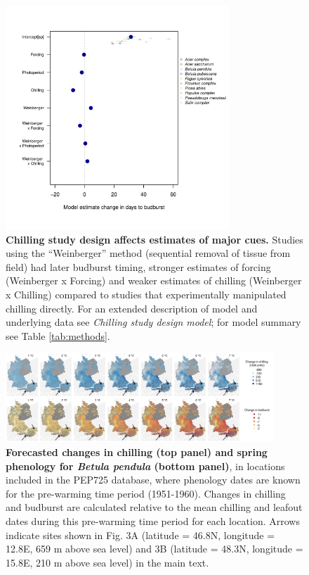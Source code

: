 \documentclass{article}
\begin{document}
\begin{figure}[h!]
\centering
\noindent \includegraphics[width=0.75\textwidth]{..//..//analyses/figures/weinberger_MU_4supp.pdf}
\caption{\textbf{Chilling study design affects estimates of major cues.} Studies using the ``Weinberger'' method (sequential removal of tissue from field) had later budburst timing, stronger estimates of forcing (Weinberger x Forcing) and weaker estimates of chilling (Weinberger x Chilling) compared to studies that experimentally manipulated chilling directly. For an extended description of model and underlying data see \emph{Chilling study design model}; for model summary see Table \ref{tab:methods}.}
\label{fig:weinberger}
\end{figure}

\begin{figure}[h!]
\centering
\noindent \includegraphics[width=0.90\textwidth]{..//..//analyses/bb_analysis/figures/forecasting/heatmapsbetpepfinalarrows.png}
\caption{\textbf{Forecasted changes in chilling (top panel) and spring phenology for \emph{Betula pendula} (bottom panel)}, in locations included in the PEP725 database, where phenology dates are known for the pre-warming time period (1951-1960). Changes in chilling and budburst are calculated relative to the mean chilling and leafout dates during this pre-warming time period for each location. Arrows indicate sites shown in Fig. 3A (latitude = 46.8\degree N, longitude =  12.8\degree E, 659 m above sea level) and 3B (latitude = 48.3\degree N, longitude =  15.8\degree E, 210 m above sea level) in the main text.} 
\label{fig:foremap}
\end{figure}
\end{document}
